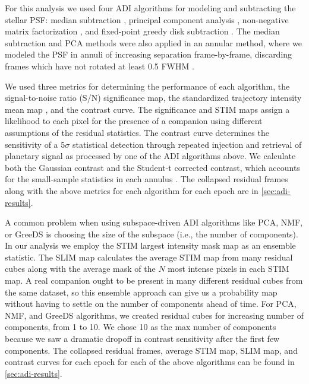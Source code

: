 \documentclass[twocolumn]{aastex631}
\begin{document}
For this analysis we used four ADI algorithms for modeling and subtracting the stellar PSF: median subtraction \citep{marois_angular_2006}, principal component analysis \citep[PCA, also referred to as KLIP;][]{soummer_detection_2012}, non-negative matrix factorization \citep[NMF;][]{ren_non-negative_2018}, and fixed-point greedy disk subtraction \citep[GreeDS;][]{pairet_reference-less_2019,pairet_mayonnaise_2020}. The median subtraction and PCA methods were also applied in an annular method, where we modeled the PSF in annuli of increasing separation frame-by-frame, discarding frames which have not rotated at least 0.5 FWHM \citep{marois_angular_2006}.

We used three metrics for determining the performance of each algorithm, the signal-to-noise ratio (S/N) significance map, the standardized trajectory intensity mean map \citep[STIM map;][]{pairet_stim_2019}, and the contrast curve. The significance and STIM maps assign a likelihood to each pixel for the presence of a companion using different assumptions of the residual statistics. The contrast curve determines the sensitivity of a 5$\sigma$ statistical detection through repeated injection and retrieval of planetary signal as processed by one of the ADI algorithms above. We calculate both the Gaussian contrast and the Student-t corrected contrast, which accounts for the small-sample statistics in each annulus \citep{mawet_fundamental_2014}. The collapsed residual frames along with the above metrics for each algorithm for each epoch are in \autoref{sec:adi-results}.

A common problem when using subspace-driven ADI algorithms like PCA, NMF, or GreeDS is choosing the size of the subspace (i.e., the number of components). In our analysis we employ the STIM largest intensity mask map \citep[SLIM map;][]{pairet_signal_2020} as an ensemble statistic. The SLIM map calculates the average STIM map from many residual cubes along with the average mask of the $N$ most intense pixels in each STIM map. A real companion ought to be present in many different residual cubes from the same dataset, so this ensemble approach can give us a probability map without having to settle on the number of components ahead of time. For PCA, NMF, and GreeDS algorithms, we created residual cubes for increasing number of components, from 1 to 10. We chose 10 as the max number of components because we saw a dramatic dropoff in contrast sensitivity after the first few components. The collapsed residual frames, average STIM map, SLIM map, and contrast curves for each epoch for each of the above algorithms can be found in \autoref{sec:adi-results}. 
\end{document}
